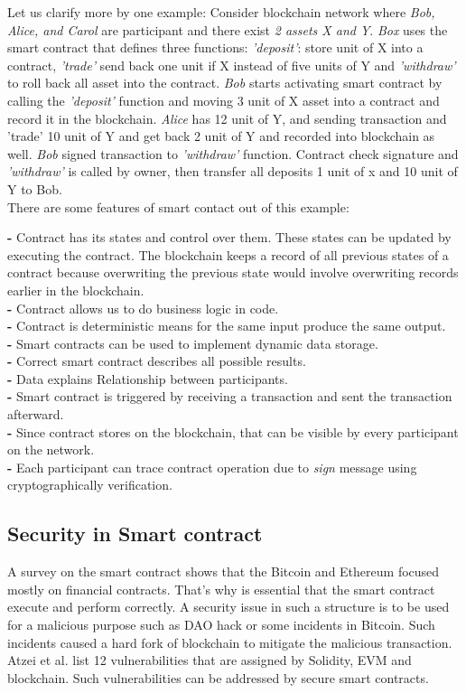 Let us clarify more by one example:
Consider blockchain network where \textit{Bob, Alice, and Carol} are participant and there exist \textit{2 assets X and Y}. \textit{Box} uses the smart contract that defines three functions: \textit{'deposit'}: store unit of X into a contract, \textit{'trade'} send back one unit if X instead of five units of Y  and \textit{'withdraw'} to roll back all asset into the contract.
\textit{Bob} starts activating smart contract by calling the \textit{'deposit'} function and moving 3 unit of X asset into a contract and record it in the blockchain. \textit{Alice} has 12 unit of Y, and sending transaction and 'trade' 10 unit of Y and get back 2 unit of Y and recorded into blockchain as well. \textit{Bob} signed transaction to \textit{'withdraw'} function. Contract check signature and \textit{'withdraw'} is called by owner, then transfer all deposits 1 unit of x and 10 unit of Y to Bob\cite{Christidis}.\\
There are some features of smart contact out of this example:

\textbf{-} Contract has its states and control over them. These states can be updated by executing the contract. The blockchain keeps a record of all previous states of a contract because overwriting the previous state would involve overwriting records earlier in the blockchain.\\
\textbf{-} Contract allows us to do business logic in code. \\
\textbf{-} Contract is deterministic means for the same input produce the same output.\\
\textbf{-} Smart contracts can be used to implement dynamic data storage.\\
\textbf{-} Correct smart contract describes all possible results.\\
\textbf{-} Data explains Relationship between participants.\\
\textbf{-} Smart contract is triggered by receiving a transaction and sent the transaction afterward.\\
\textbf{-} Since contract stores on the blockchain, that can be visible by every participant on the network.\\
\textbf{-} Each participant can trace contract operation due to \textit{sign} message using cryptographically verification.\\

\subsection{Security in Smart contract}
A survey on the smart contract shows that the Bitcoin and Ethereum focused mostly on financial contracts. That's why is essential that the smart contract execute and perform correctly. 
A security issue in such a structure is to be used for a malicious purpose such as DAO hack or some incidents in Bitcoin. Such incidents 
caused a hard fork of blockchain to mitigate the malicious transaction.
Atzei et al. list 12 vulnerabilities that are assigned by Solidity, EVM and blockchain. Such vulnerabilities can be addressed by secure smart contracts\cite{Zdun}.
